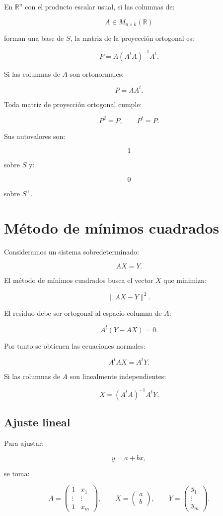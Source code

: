 \documentclass[11pt,a4paper]{article}
\newcommand{\R}{\mathbb{R}}
\begin{document}
En $\R^n$ con el producto escalar usual, si las columnas de:

\[
A\in M_{n\times k}(\R)
\]

forman una base de $S$, la matriz de la proyección ortogonal es:

\[
\boxed{
P
=
A(A^tA)^{-1}A^t.
}
\]

Si las columnas de $A$ son ortonormales:

\[
\boxed{
P=AA^t.
}
\]

Toda matriz de proyección ortogonal cumple:

\[
\boxed{
P^2=P,
\qquad
P^t=P.
}
\]

Sus autovalores son:

\[
1
\]

sobre $S$ y:

\[
0
\]

sobre $S^\perp$.

\section{Método de mínimos cuadrados}

Consideramos un sistema sobredeterminado:

\[
AX=Y.
\]

El método de mínimos cuadrados busca el vector $X$ que minimiza:

\[
\|AX-Y\|^2.
\]

El residuo debe ser ortogonal al espacio columna de $A$:

\[
A^t(Y-AX)=0.
\]

Por tanto se obtienen las ecuaciones normales:

\[
\boxed{
A^tAX=A^tY.
}
\]

Si las columnas de $A$ son linealmente independientes:

\[
\boxed{
X=(A^tA)^{-1}A^tY.
}
\]

\subsection{Ajuste lineal}

Para ajustar:

\[
y=a+bx,
\]

se toma:

\[
A=
\begin{pmatrix}
1&x_1\\
\vdots&\vdots\\
1&x_m
\end{pmatrix},
\qquad
X=
\begin{pmatrix}
a\\b
\end{pmatrix},
\qquad
Y=
\begin{pmatrix}
y_1\\\vdots\\y_m
\end{pmatrix}.
\]
\end{document}
